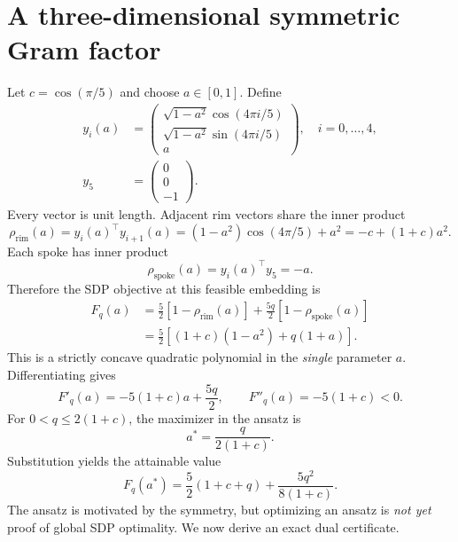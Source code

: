 \section{A three-dimensional symmetric Gram factor}
Let $c=\cos(\pi/5)$ and choose $a\in[0,1]$. Define
\begin{equation}\label{eq:wheelY}
\begin{aligned}
y_i(a)&=\begin{pmatrix}\sqrt{1-a^2}\cos(4\pi i/5)\\\sqrt{1-a^2}\sin(4\pi i/5)\\a\end{pmatrix},\quad i=0,\ldots,4,\\
y_5&=\begin{pmatrix}0\\0\\-1\end{pmatrix}.
\end{aligned}
\end{equation}
Every vector is unit length. Adjacent rim vectors share the inner product
\begin{equation}\label{eq:wheelrim}
\rho_{\mathrm{rim}}(a)=y_i(a)^\top y_{i+1}(a)
=(1-a^2)\cos(4\pi/5)+a^2=-c+(1+c)a^2.
\end{equation}
Each spoke has inner product
\begin{equation}\label{eq:wheelspoke}
\rho_{\mathrm{spoke}}(a)=y_i(a)^\top y_5=-a.
\end{equation}
Therefore the SDP objective at this feasible embedding is
\begin{align}
F_q(a)&=\frac52\left[1-\rho_{\mathrm{rim}}(a)\right]+\frac{5q}{2}\left[1-\rho_{\mathrm{spoke}}(a)\right]\\
&=\frac52\left[(1+c)(1-a^2)+q(1+a)\right].\label{eq:wheelparam}
\end{align}
This is a strictly concave quadratic polynomial in the \emph{single} parameter $a$. Differentiating gives
\[
F'_q(a)=-5(1+c)a+\frac{5q}{2},\qquad F''_q(a)=-5(1+c)<0.
\]
For $0<q\le2(1+c)$, the maximizer in the ansatz is
\begin{equation}\label{eq:wheelastar}
\boxed{a^*=\frac{q}{2(1+c)}.}
\end{equation}
Substitution yields the attainable value
\begin{equation}\label{eq:wheel-value}
\boxed{F_q(a^*)=\frac52(1+c+q)+\frac{5q^2}{8(1+c)}.}
\end{equation}
The ansatz is motivated by the symmetry, but optimizing an ansatz is \emph{not yet} proof of global SDP optimality. We now derive an exact dual certificate.

